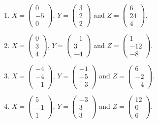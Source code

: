 \bigskip
\begin{enumerate}[label=\arabic*.,  leftmargin=*]
\item $X = \begin{pmatrix} 0 \\ -5 \\ 0 \end{pmatrix}$, $Y = \begin{pmatrix} 3 \\ 2 \\ 2 \end{pmatrix}$ and $Z = \begin{pmatrix} 6 \\ 24 \\ 4 \end{pmatrix}$.
\item $X = \begin{pmatrix} 0 \\ 3 \\ 4 \end{pmatrix}$, $Y = \begin{pmatrix} -1 \\ 3 \\ -4 \end{pmatrix}$ and $Z = \begin{pmatrix} 1 \\ -12 \\ -8 \end{pmatrix}$.
\item $X = \begin{pmatrix} -4 \\ -4 \\ -1 \end{pmatrix}$, $Y = \begin{pmatrix} -1 \\ -5 \\ -3 \end{pmatrix}$ and $Z = \begin{pmatrix} 6 \\ -2 \\ -4 \end{pmatrix}$.
\item $X = \begin{pmatrix} 5 \\ -1 \\ 1 \end{pmatrix}$, $Y = \begin{pmatrix} -3 \\ 3 \\ 3 \end{pmatrix}$ and $Z = \begin{pmatrix} 12 \\ 0 \\ 6 \end{pmatrix}$.

\end{enumerate}
